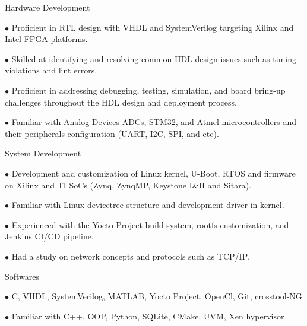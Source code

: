 


\begin{cvskills}


\cvskill
{Hardware Development} %
{
\item[$\bullet$] Proficient in RTL design with VHDL and SystemVerilog targeting Xilinx and Intel FPGA platforms.
\item[$\bullet$] Skilled at identifying and resolving common HDL design issues such as timing violations and lint errors.
\item[$\bullet$] Proficient in addressing debugging, testing, simulation, and board bring-up challenges throughout the HDL design and deployment process.
\item[$\bullet$] Familiar with Analog Devices ADCs, STM32, and Atmel microcontrollers and their peripherals configuration (UART, I2C, SPI, and etc).
}


\cvskill
{System Development} %
{
\item[$\bullet$] Development and customization of Linux kernel, U-Boot, RTOS and firmware on Xilinx and TI SoCs (Zynq, ZynqMP, Keystone I\&II and Sitara).
\item[$\bullet$] Familiar with Linux devicetree structure and development driver in kernel.
\item[$\bullet$] Experienced with the Yocto Project build system, rootfs customization, and Jenkins CI/CD pipeline.
\item[$\bullet$] Had a study on network concepts and protocols such as TCP/IP.
}


\cvskill
{Softwares} %
{
\item[$\bullet$] C, VHDL, SystemVerilog, MATLAB, Yocto Project, OpenCl, Git, crosstool-NG
\item[$\bullet$] Familiar with C++, OOP, Python, SQLite, CMake, UVM, Xen hypervisor
}


\end{cvskills}
